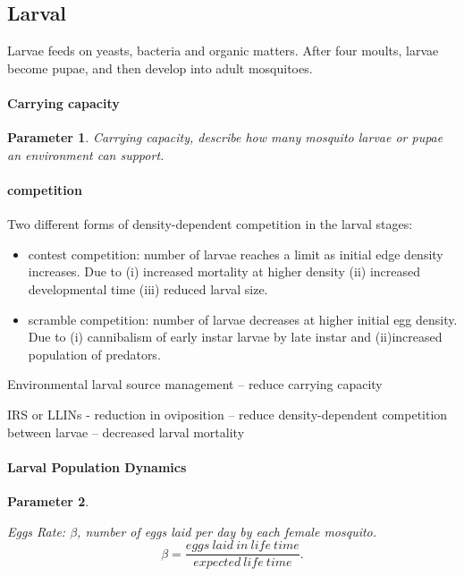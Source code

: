 \documentclass[a4paper, 12pt, twoside]{article}
\newtheorem{parameter}{Parameter}
\begin{document}
\subsection{Larval}

Larvae feeds on yeasts, bacteria and organic matters.
After four moults, larvae become pupae, and then develop into adult mosquitoes.

\paragraph{Carrying capacity}%
\label{par:carrying_capacity}
\begin{parameter}
	Carrying capacity, describe how many mosquito larvae or pupae an environment can support.
\end{parameter}

\paragraph{competition}%
\label{par:competition}
Two different forms of density-dependent competition in the larval stages:

\begin{itemize}
	\item contest competition: number of larvae reaches a limit as initial edge density increases. Due to (i) increased mortality at higher density (ii) increased developmental time (iii) reduced larval size.
	\item scramble competition: number of larvae decreases at higher initial egg density. Due to (i) cannibalism of early instar larvae by late instar and (ii)increased population of predators.
\end{itemize}

Environmental larval source management -- reduce carrying capacity

IRS or LLINs - reduction in oviposition -- reduce density-dependent competition between larvae -- decreased larval mortality

\paragraph{Larval Population Dynamics}%
\label{par:larval_population_dynamics}

\begin{parameter}
	\label{para:eggs_laid_per_day}

	Eggs Rate: $\beta$, number of eggs laid per day by each female mosquito.
	\[
		\beta=\frac{eggs\:laid\:in\:life\:time}{expected\:life\:time}
		.\]

\end{parameter}
\end{document}
